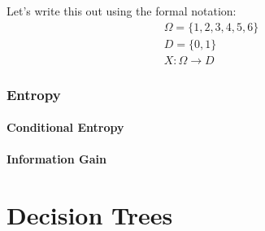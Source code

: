 \documentclass{mlnotes}
\begin{document}
Let's write this out using the formal notation:
\begin{gather*}
  \Omega=\{1,2,3,4,5,6\}\\
  D=\{0,1\}\\
  X : \Omega \rightarrow D
\end{gather*}

\section{Entropy}
\subsection{Conditional Entropy}
\subsection{Information Gain}

\part{Decision Trees}

\printindex[defn]
\end{document}
